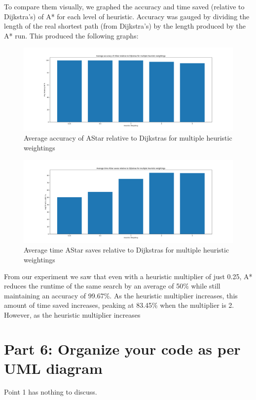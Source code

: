 \documentclass[12pt]{article}
\begin{document}
To compare them visually, we graphed the accuracy and time saved (relative to Dijkstra's) of A* for each level of heuristic.
Accuracy was gauged by dividing the length of the real shortest path (from Dijkstra's) by the length produced by the A* run.
This produced the following graphs:
\begin{figure}[H]
    \centering
    \includegraphics[width=\textwidth]{images/Average accuracy of AStar relative to Dijkstras for multiple heuristic weightings.png}
    \caption{Average accuracy of AStar relative to Dijkstras for multiple heuristic weightings}
\end{figure}

\begin{figure}[H]
    \centering
    \includegraphics[width=\textwidth]{images/Average time AStar saves relative to Dijkstras for multiple heuristic weightings.png}
    \caption{Average time AStar saves relative to Dijkstras for multiple heuristic weightings}
\end{figure}

From our experiment we saw that even with a heuristic multiplier of just 0.25, A* reduces the runtime of the same search by
an average of 50\% while still maintaining an accuracy of 99.67\%. As the heuristic multiplier increases, this amount of time
saved increases, peaking at 83.45\% when the multiplier is 2. However, as the heuristic multiplier increases

\newpage
\section*{Part 6: Organize your code as per UML diagram}
Point 1 has nothing to discuss.
\end{document}
